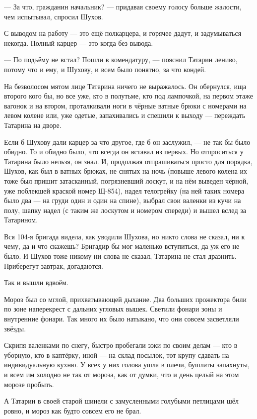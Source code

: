 --- За что, гражданин начальник? --- придавая своему голосу больше жалости, чем испытывал, 
спросил Шухов.

С выводом на работу --- это ещё полкарцера, и горячее дадут, и задумываться некогда. Полный 
карцер --- это когда без вывода.

--- По подъёму не встал? Пошли в комендатуру, --- пояснил Татарин лениво, потому что и ему, и 
Шухову, и всем было понятно, за что кондей.

На безволосом мятом лице Татарина ничего не выражалось. Он обернулся, ища второго кого бы, но 
все уже, кто в полутьме, кто под лампочкой, на первом этаже вагонок и на втором, проталкивали 
ноги в чёрные ватные брюки с номерами на левом колене или, уже одетые, запахивались и спешили 
к выходу --- переждать Татарина на дворе.

Если б Шухову дали карцер за что другое, где б он заслужил, --- не так бы было обидно. То и 
обидно было, что всегда он вставал из первых. Но отпроситься у Татарина было нельзя, он знал. 
И, продолжая отпрашиваться просто для порядка, Шухов, как был в ватных брюках, не снятых на 
ночь (повыше левого колена их тоже был пришит затасканный, погрязневший лоскут, и на нём 
выведен чёрной, уже поблекшей краской номер Щ-854), надел телогрейку (на ней таких номера было 
два --- на груди один и один на спине), выбрал свои валенки из кучи на полу, шапку надел (с таким 
же лоскутом и номером спереди) и вышел вслед за Татарином.

Вся 104-я бригада видела, как уводили Шухова, но никто слова не сказал, ни к чему, да и что 
скажешь? Бригадир бы мог маленько вступиться, да уж его не было. И Шухов тоже никому ни слова 
не сказал, Татарина не стал дразнить. Приберегут завтрак, догадаются.

Так и вышли вдвоём.

Мороз был со мглой, прихватывающей дыхание. Два больших прожектора били по зоне наперекрест 
с дальних угловых вышек. Светили фонари зоны и внутренние фонари. Так много их было натыкано, 
что они совсем засветляли звёзды.

Скрипя валенками по снегу, быстро пробегали зэки по своим делам --- кто в уборную, кто в 
каптёрку, иной --- на склад посылок, тот крупу сдавать на индивидуальную кухню. У всех у них 
голова ушла в плечи, бушлаты запахнуты, и всем им холодно не так от мороза, как от думки, что и 
день целый на этом морозе пробыть.

А Татарин в своей старой шинели с замусленными голубыми петлицами шёл ровно, и мороз как 
будто совсем его не брал.


